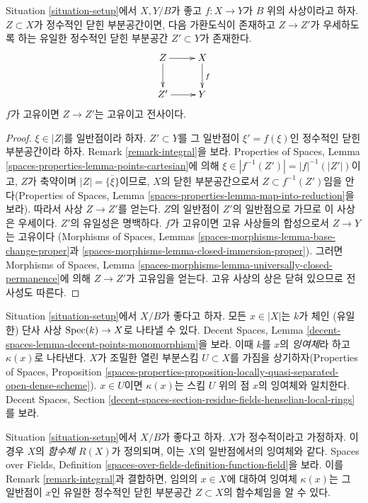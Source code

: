 \begin{lemma}
\label{lemma-proper-image}
Situation \ref{situation-setup}에서 $X,Y/B$가 좋고 $f : X \to Y$가
$B$ 위의 사상이라고 하자. $Z \subset X$가 정수적인 닫힌 부분공간이면,
다음 가환도식이 존재하고 $Z \to Z'$가 우세하도록 하는 유일한 정수적인
닫힌 부분공간 $Z' \subset Y$가 존재한다.
$$
\xymatrix{
Z \ar[r] \ar[d] & X \ar[d]^f \\
Z' \ar[r] & Y
}
$$
$f$가 고유이면 $Z \to Z'$는 고유이고 전사이다.
\end{lemma}

\begin{proof}
$\xi \in |Z|$를 일반점이라 하자. $Z' \subset Y$를 그 일반점이
$\xi' = f(\xi)$인 정수적인 닫힌 부분공간이라 하자. Remark
\ref{remark-integral}을 보라. Properties of Spaces, Lemma
\ref{spaces-properties-lemma-points-cartesian}에 의해
$\xi \in |f^{-1}(Z')| = |f|^{-1}(|Z'|)$이고,
$Z$가 축약이며 $|Z| = \overline{\{\xi\}}$이므로, $X$의 닫힌
부분공간으로서 $Z \subset f^{-1}(Z')$임을 안다(Properties of Spaces,
Lemma \ref{spaces-properties-lemma-map-into-reduction}을 보라).
따라서 사상 $Z \to Z'$를 얻는다. $Z$의 일반점이 $Z'$의 일반점으로
가므로 이 사상은 우세이다. $Z'$의 유일성은 명백하다.
$f$가 고유이면 고유 사상들의 합성으로서 $Z \to Y$는 고유이다
(Morphisms of Spaces, Lemmas
\ref{spaces-morphisms-lemma-base-change-proper}과
\ref{spaces-morphisms-lemma-closed-immersion-proper}).
그러면 Morphisms of Spaces, Lemma
\ref{spaces-morphisms-lemma-universally-closed-permanence}에 의해
$Z \to Z'$가 고유임을 얻는다. 고유 사상의 상은 닫혀 있으므로 전사성도 따른다.
\end{proof}

\begin{remark}
\label{remark-residue-field}
Situation \ref{situation-setup}에서 $X/B$가 좋다고 하자. 모든
$x \in |X|$는 $k$가 체인 (유일한) 단사 사상 $\mathop{\mathrm{Spec}}(k) \to X$로
나타낼 수 있다. Decent Spaces, Lemma
\ref{decent-spaces-lemma-decent-points-monomorphism}을 보라. 이때 $k$를
$x$의 {\it 잉여체}라 하고 $\kappa(x)$로 나타낸다. $X$가 조밀한 열린
부분스킴 $U \subset X$를 가짐을 상기하자(Properties of Spaces,
Proposition
\ref{spaces-properties-proposition-locally-quasi-separated-open-dense-scheme}).
$x \in U$이면 $\kappa(x)$는 스킴 $U$ 위의 점 $x$의 잉여체와 일치한다.
Decent Spaces, Section
\ref{decent-spaces-section-residue-fields-henselian-local-rings}를 보라.
\end{remark}

\begin{remark}
\label{remark-function-field}
Situation \ref{situation-setup}에서 $X/B$가 좋다고 하자. $X$가 정수적이라고
가정하자. 이 경우 $X$의 {\it 함수체} $R(X)$가 정의되며, 이는 $X$의
일반점에서의 잉여체와 같다. Spaces over Fields, Definition
\ref{spaces-over-fields-definition-function-field}을 보라.
이를 Remark \ref{remark-integral}과 결합하면, 임의의 $x \in X$에 대하여
잉여체 $\kappa(x)$는 그 일반점이 $x$인 유일한 정수적인 닫힌 부분공간
$Z \subset X$의 함수체임을 알 수 있다.
\end{remark}

